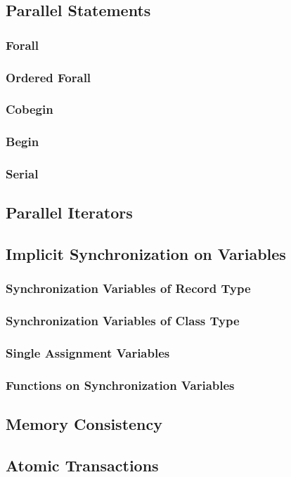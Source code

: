 \documentclass[10pt,twoside,titlepage]{article}
\begin{document}
\subsection{Parallel Statements}
\subsubsection{Forall}
\subsubsection{Ordered Forall}
\subsubsection{Cobegin}
\subsubsection{Begin}
\subsubsection{Serial}
\subsection{Parallel Iterators}
\subsection{Implicit Synchronization on Variables}
\subsubsection{Synchronization Variables of Record Type}
\subsubsection{Synchronization Variables of Class Type}
\subsubsection{Single Assignment Variables}
\subsubsection{Functions on Synchronization Variables}
\subsection{Memory Consistency}
\subsection{Atomic Transactions}
\end{document}
